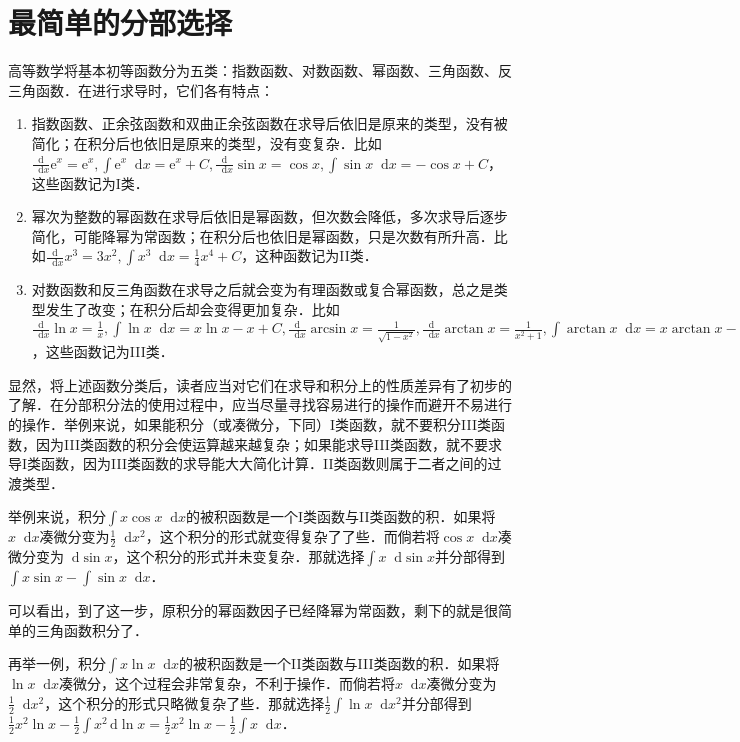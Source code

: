 \documentclass{ctexbook}
\newcommand*{\dif}{\mathop{}\!\mathrm{d}}
\begin{document}
\section{最简单的分部选择}
高等数学将基本初等函数分为五类：指数函数、对数函数、幂函数、三角函数、反三角函数．在进行求导时，它们各有特点：\par
\begin{enumerate}
	\item 指数函数、正余弦函数和双曲正余弦函数在求导后依旧是原来的类型，没有被简化；在积分后也依旧是原来的类型，没有变复杂．比如$\frac{\mathrm{d}}{\dif{x}}\mathrm{e}^{x}=\mathrm{e}^{x},\int\mathrm{e}^{x}\dif{x}=\mathrm{e}^{x}+C,\frac{\mathrm{d}}{\dif{x}}\sin{x}=\cos{x},\int\sin{x}\dif{x}=-\cos{x}+C$，这些函数记为I类．
	\item 幂次为整数的幂函数在求导后依旧是幂函数，但次数会降低，多次求导后逐步简化，可能降幂为常函数；在积分后也依旧是幂函数，只是次数有所升高．比如$\frac{\mathrm{d}}{\dif{x}}x^{3}=3x^{2},\int x^{3}\dif{x}=\frac{1}{4}x^{4}+C$，这种函数记为II类．
	\item 对数函数和反三角函数在求导之后就会变为有理函数或复合幂函数，总之是类型发生了改变；在积分后却会变得更加复杂．比如$\frac{\mathrm{d}}{\dif{x}}\ln{x}=\frac{1}{x},\int\ln{x}\dif{x}=x\ln{x}-x+C,\frac{\mathrm{d}}{\dif{x}}\arcsin{x}=\frac{1}{\sqrt{1-x^{2}}},\frac{\mathrm{d}}{\dif{x}}\arctan{x}=\frac{1}{x^{2}+1},\int\arctan{x}\dif{x}=x\arctan{x}-\frac{1}{2}\ln{\left(x^{2}+1\right)}+C$，这些函数记为III类．
\end{enumerate}\par
显然，将上述函数分类后，读者应当对它们在求导和积分上的性质差异有了初步的了解．在分部积分法的使用过程中，应当尽量寻找容易进行的操作而避开不易进行的操作．举例来说，如果能积分（或凑微分，下同）I类函数，就不要积分III类函数，因为III类函数的积分会使运算越来越复杂；如果能求导III类函数，就不要求导I类函数，因为III类函数的求导能大大简化计算．II类函数则属于二者之间的过渡类型．\par
举例来说，积分$\int x\cos{x}\dif{x}$的被积函数是一个I类函数与II类函数的积．如果将$x\dif{x}$凑微分变为$\frac{1}{2}\dif{x}^{2}$，这个积分的形式就变得复杂了了些．而倘若将$\cos{x}\dif{x}$凑微分变为$\dif{\sin{x}}$，这个积分的形式并未变复杂．那就选择$\int x\dif{\sin{x}}$并分部得到$\int x\sin{x}-\int\sin{x}\dif{x}$．\par
可以看出，到了这一步，原积分的幂函数因子已经降幂为常函数，剩下的就是很简单的三角函数积分了．\par
再举一例，积分$\int x\ln{x}\dif{x}$的被积函数是一个II类函数与III类函数的积．如果将$\ln{x}\dif{x}$凑微分，这个过程会非常复杂，不利于操作．而倘若将$x\dif{x}$凑微分变为$\frac{1}{2}\dif{x}^{2}$，这个积分的形式只略微复杂了些．那就选择$\frac{1}{2}\int\ln{x}\dif{x}^{2}$并分部得到$\frac{1}{2}x^{2}\ln{x}-\frac{1}{2}\int x^{2}\,\mathrm{d}\ln{x}=\frac{1}{2}x^{2}\ln{x}-\frac{1}{2}\int x\dif{x}$．\par
\end{document}
